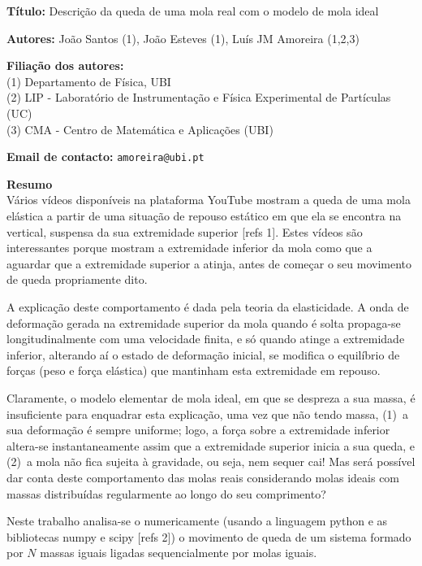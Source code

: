 \documentclass{report}
\begin{document}
\textbf{Título: }Descrição da queda de uma mola real com o modelo de mola ideal

\vspace{.5em}
\textbf{Autores: }João Santos (1), João Esteves (1), Luís JM Amoreira (1,2,3)

\vspace{.5em}
\textbf{Filiação dos autores: }\\
(1) Departamento de Física, UBI\\
(2) LIP - Laboratório de Instrumentação e Física Experimental de Partículas (UC)\\
(3) CMA - Centro de Matemática e Aplicações (UBI)

\vspace{.5em}
\textbf{Email de contacto: }\texttt{amoreira@ubi.pt}

\vspace{.5em}
\textbf{Resumo}\\
  Vários vídeos disponíveis na plataforma YouTube mostram a queda de uma mola
  elástica a partir de uma situação de repouso estático em que ela se encontra
  na vertical, suspensa da sua extremidade superior [refs 1]. Estes vídeos são
  interessantes porque mostram a extremidade inferior da mola como que a aguardar
  que a extremidade superior a atinja, antes de começar o seu movimento de queda
  propriamente dito. 
	
  A explicação deste comportamento é dada pela teoria da elasticidade.  A onda
  de deformação gerada na extremidade superior da mola quando é solta propaga-se
  longitudinalmente com uma velocidade finita, e só quando atinge a extremidade
  inferior, alterando aí o estado de deformação inicial, se modifica o
  equilíbrio de forças (peso e força elástica) que mantinham esta extremidade em
  repouso.
	
  Claramente, o modelo elementar de mola ideal, em que se despreza a sua massa,
  é insuficiente para enquadrar esta explicação, uma vez que não tendo massa,
  (1)~a sua deformação é sempre uniforme; logo, a força sobre a extremidade
  inferior altera-se instantaneamente assim que a extremidade superior inicia a
  sua queda, e (2)~a mola não fica sujeita à gravidade, ou seja, nem sequer cai!
  Mas será possível dar conta deste comportamento das molas reais considerando
  molas ideais com massas distribuídas regularmente ao longo do seu
  comprimento?

  Neste trabalho analisa-se o numericamente (usando a linguagem python e as
  bibliotecas numpy e scipy [refs 2]) o movimento de queda de um sistema formado por $N$
  massas iguais ligadas sequencialmente por molas iguais.
\end{document}
